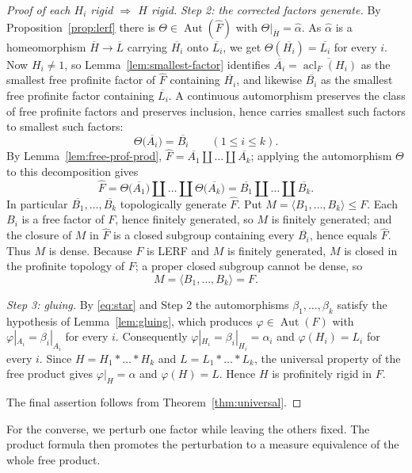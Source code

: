 \documentclass[11pt]{amsart}
\theoremstyle{plain}
\theoremstyle{definition}
\newcommand{\acl}{\operatorname{acl}}
\newcommand{\Aut}{\operatorname{Aut}}
\newcommand{\Fhat}{\widehat{F}}
\begin{document}
\begin{proof}[Proof of each $H_i$ rigid $\Rightarrow$ $H$ rigid]
\medskip\noindent\emph{Step 2: the corrected factors generate.}
By Proposition~\ref{prop:lerf} there is $\Theta\in\Aut(\Fhat)$ with
$\Theta|_{\overline H}=\widehat\alpha$.  As $\widehat\alpha$ is a homeomorphism
$\overline H\to\overline L$ carrying $\overline{H_i}$ onto $\overline{L_i}$, we
get $\Theta(\overline{H_i})=\overline{L_i}$ for every $i$.  Now $H_i\neq1$, so
Lemma~\ref{lem:smallest-factor} identifies
$\overline{A_i}=\overline{\acl_F(H_i)}$ as the smallest free profinite factor of
$\Fhat$ containing $\overline{H_i}$, and likewise $\overline{B_i}$ as the
smallest free profinite factor containing $\overline{L_i}$.  A continuous
automorphism preserves the class of free profinite factors and preserves
inclusion, hence carries smallest such factors to smallest such factors:
\[
  \Theta\bigl(\overline{A_i}\bigr)=\overline{B_i}\qquad(1\le i\le k).
\]
By Lemma~\ref{lem:free-prof-prod},
$\Fhat=\overline{A_1}\amalg\dots\amalg\overline{A_k}$; applying the automorphism
$\Theta$ to this decomposition gives
\[
  \Fhat=\Theta\bigl(\overline{A_1}\bigr)\amalg\dots\amalg
        \Theta\bigl(\overline{A_k}\bigr)
       =\overline{B_1}\amalg\dots\amalg\overline{B_k}.
\]
In particular $\overline{B_1},\dots,\overline{B_k}$ topologically generate
$\Fhat$.  Put $M=\langle B_1,\dots,B_k\rangle\le F$.  Each $B_i$ is a free factor
of $F$, hence finitely generated, so $M$ is finitely generated; and the closure of
$M$ in $\Fhat$ is a closed subgroup containing every $\overline{B_i}$, hence
equals $\Fhat$.  Thus $M$ is dense.  Because $F$ is LERF and $M$ is finitely
generated, $M$ is closed in the profinite topology of $F$; a proper closed
subgroup cannot be dense, so
\[
  M=\langle B_1,\dots,B_k\rangle=F .
\]

\medskip\noindent\emph{Step 3: gluing.}
By \eqref{eq:star} and Step 2 the automorphisms $\beta_1,\dots,\beta_k$ satisfy
the hypothesis of Lemma~\ref{lem:gluing}, which produces $\varphi\in\Aut(F)$ with
$\varphi|_{A_i}=\beta_i|_{A_i}$ for every $i$.  Consequently
$\varphi|_{H_i}=\beta_i|_{H_i}=\alpha_i$ and $\varphi(H_i)=L_i$ for every $i$.
Since $H=H_1*\dots*H_k$ and $L=L_1*\dots*L_k$, the universal property of the free
product gives $\varphi|_H=\alpha$ and $\varphi(H)=L$.  Hence $H$ is profinitely
rigid in $F$.

The final assertion follows from Theorem~\ref{thm:universal}.
\end{proof}

For the converse, we perturb one factor while leaving the others fixed.  The
product formula then promotes the perturbation to a measure equivalence of the
whole free product.
\end{document}
